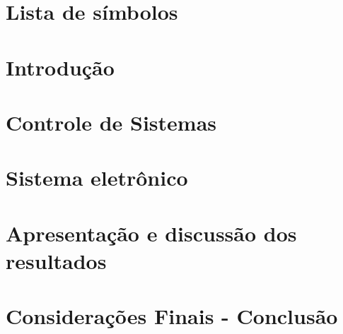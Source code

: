 \documentclass[12pt, a4paper]{report}
\begin{document}
\capa
\folhaderosto
\fichacatalografica
\folhadeaprovacao

\dedicatoria{}
\agradecimentos{}
\epigrafe{}
\resumo{}
\resumolinguaestrangeira{}
\listadefiguras
\listadetabelas
\listadeabreviaturasesiglas

\chapter*{Lista de símbolos}


\sumario

\onehalfspacing		%

\chapter{Introdução}


\chapter{Controle de Sistemas}


\chapter{Sistema eletrônico}


\chapter{Apresentação e discussão dos resultados}


\chapter{Considerações Finais - Conclusão}









\end{document}
